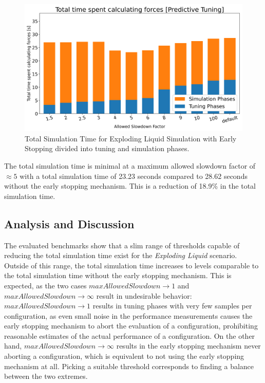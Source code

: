 \documentclass[conference]{IEEEtran}
\begin{document}
\begin{figure}[H]
    \centering

    \includegraphics[width=\columnwidth]{../data/explodingLiquid/cluster/predictiveTuning/analytics/total_time_average.png}

    \caption{Total Simulation Time for Exploding Liquid Simulation with Early Stopping divided into tuning and simulation phases.}
    \label{fig:predictive_tuning}
\end{figure}


The total simulation time is minimal at a maximum allowed slowdown factor of $\approx5$ with a total simulation time of 23.23 seconds compared to 28.62 seconds without the early stopping mechanism. This is a reduction of 18.9\% in the total simulation time.

\subsection{Analysis and Discussion}

The evaluated benchmarks show that a slim range of thresholds capable of reducing the total simulation time exist for the \textit{Exploding Liquid} scenario.
Outside of this range, the total simulation time increases to levels comparable to the total simulation time without the early stopping mechanism. This is expected, as the two cases $maxAllowedSlowdown \to 1$ and $maxAllowedSlowdown \to \infty$ result in undesirable behavior: $maxAllowedSlowdown \to 1$ results in tuning phases with very few samples per configuration, as even small noise in the performance measurements causes the early stopping mechanism to abort the evaluation of a configuration, prohibiting reasonable estimates of the actual performance of a configuration. On the other hand, $maxAllowedSlowdown \to \infty$ results in the early stopping mechanism never aborting a configuration, which is equivalent to not using the early stopping mechanism at all. Picking a suitable threshold corresponds to finding a balance between the two extremes.
\end{document}
